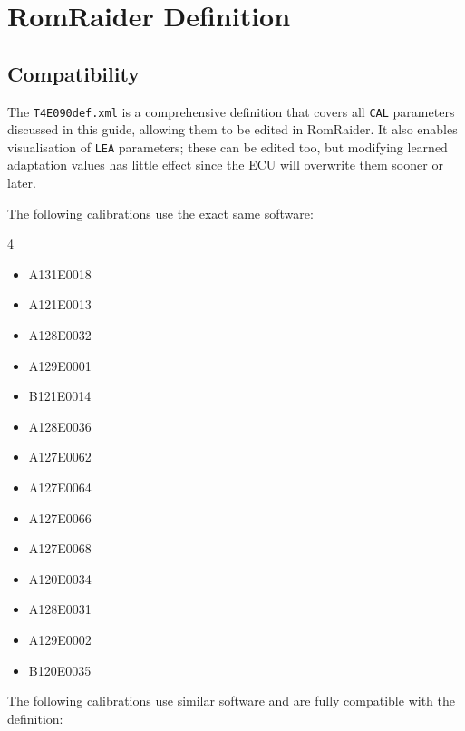 \documentclass[a4paper,11pt]{article}
\renewcommand{\_}{\oldunderscore\allowbreak}
\begin{document}
\section{RomRaider Definition}

\subsection{Compatibility}

The \texttt{T4E090\_def.xml} is a comprehensive definition that covers all
\texttt{CAL\_} parameters discussed in this guide, allowing them to be edited
in RomRaider. It also enables visualisation of \texttt{LEA\_} parameters;
these can be edited too, but modifying learned adaptation values has little
effect since the ECU will overwrite them sooner or later.

The following calibrations use the exact same software:

\begin{multicols}{4}
\begin{itemize}
	\item A131E0018
	\item A121E0013
	\item A128E0032
	\item A129E0001
	\item B121E0014
	\item A128E0036
	\item A127E0062
	\item A127E0064
	\item A127E0066
	\item A127E0068
	\item A120E0034
	\item A128E0031
	\item A129E0002
	\item B120E0035
\end{itemize}
\end{multicols}

The following calibrations use similar software and are fully compatible
with the definition:
\end{document}
